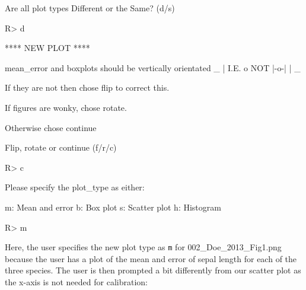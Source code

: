 \documentclass[12pt]{article}
\newcommand{\code}[1]{\texttt{#1}}
\begin{document}
\begin{CodeChunk}
\begin{CodeOutput}
Are all plot types Different or the Same? (d/s)
\end{CodeOutput}
\begin{CodeInput}
R> d
\end{CodeInput}
\begin{CodeOutput}
**** NEW PLOT ****

mean_error and boxplots should be vertically orientated
       _ 
       |  
  I.E. o    NOT  |-o-|
       |
       _

If they are not then chose flip to correct this.

If figures are wonky, chose rotate.

Otherwise chose continue

Flip, rotate or continue (f/r/c) 
\end{CodeOutput}
\begin{CodeInput}
R> c
\end{CodeInput}
\begin{CodeOutput}
Please specify the plot_type as either:

 m: Mean and error
 b: Box plot
 s: Scatter plot 
 h: Histogram
\end{CodeOutput}
\begin{CodeInput}
R> m
\end{CodeInput}
\end{CodeChunk}

Here, the user specifies the new plot type as \code{m} for 002\_Doe\_2013\_Fig1.png because the user has a plot of the mean and error of sepal length for each of the three species. The user is then prompted a bit differently from our scatter plot as the x-axis is not needed for calibration:
\end{document}
